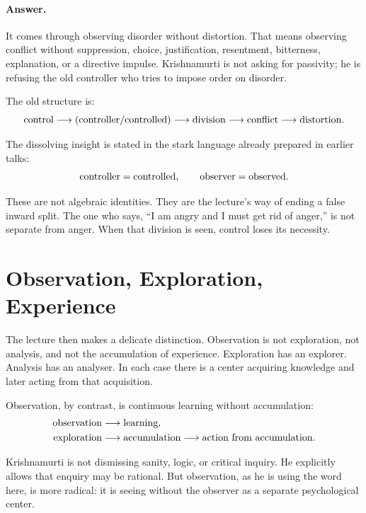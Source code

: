 \documentclass[11pt,oneside]{book}
\begin{document}
\paragraph{Answer.}
It comes through observing disorder without distortion. That means observing conflict without suppression, choice, justification, resentment, bitterness, explanation, or a directive impulse. Krishnamurti is not asking for passivity; he is refusing the old controller who tries to impose order on disorder.

The old structure is:
\begin{equation}
\hbox{control}
\longrightarrow
(\hbox{controller}/\hbox{controlled})
\longrightarrow
\hbox{division}
\longrightarrow
\hbox{conflict}
\longrightarrow
\hbox{distortion}.
\end{equation}

The dissolving insight is stated in the stark language already prepared in earlier talks:
\begin{equation}
\hbox{controller}=\hbox{controlled},
\qquad
\hbox{observer}=\hbox{observed}.
\end{equation}

These are not algebraic identities. They are the lecture's way of ending a false inward split. The one who says, ``I am angry and I must get rid of anger,'' is not separate from anger. When that division is seen, control loses its necessity.

\section{Observation, Exploration, Experience}

The lecture then makes a delicate distinction. Observation is not exploration, not analysis, and not the accumulation of experience. Exploration has an explorer. Analysis has an analyser. In each case there is a center acquiring knowledge and later acting from that acquisition.

Observation, by contrast, is continuous learning without accumulation:
\begin{align}
\hbox{observation} &\longrightarrow \hbox{learning},\\
\hbox{exploration} &\longrightarrow \hbox{accumulation}
\longrightarrow \hbox{action from accumulation}.
\end{align}

Krishnamurti is not dismissing sanity, logic, or critical inquiry. He explicitly allows that enquiry may be rational. But observation, as he is using the word here, is more radical: it is seeing without the observer as a separate psychological center.
\end{document}
